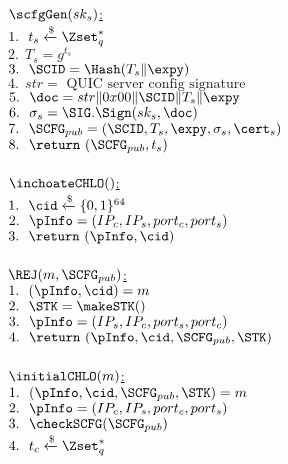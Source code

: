 

\noindent
\underline{$\scfgGen(sk_s)$:} \\
 $1.\ \ t_s \xleftarrow{\$} \Zset_{q}^{\ast}$ \\
 $2.\ \ T_s = g^{t_s}$ \\
 $3.\ \ \SCID = \Hash(T_s \| \expy)$ \\
 $4.\ \ str = \text{ QUIC server config signature }$ \\
 $5.\ \ \doc = str \| 0x00 \| \SCID \| T_s \| \expy$ \\
 $6.\ \ \sigma_s = \SIG.\Sign(sk_s, \doc)$ \\
 $7.\ \ \SCFG_{pub} = (\SCID, T_s, \expy, \sigma_s, \cert_s)$ \\
 $8.\ \ \return\ (\SCFG_{pub}, t_s)$ \\
\\
\underline{$\inchoateCHLO()$:} \\
 $1.\ \ \cid \xleftarrow{\$} \{0,1\}^{64} $ \\
 $2.\ \ \pInfo = (IP_c, IP_s, port_c, port_s)$ \\
 $3.\ \ \return\ (\pInfo, \cid)$ \\
\\
\underline{$\REJ(m, \SCFG_{pub})$:} \\
 $1.\ \ (\pInfo, \cid) = m$ \\
 $2.\ \ \STK = \makeSTK()$ \\
 $3.\ \ \pInfo = (IP_s, IP_c, port_s, port_c)$ \\
 $4.\ \ \return\ (\pInfo, \cid, \SCFG_{pub}, \STK)$ \\
\\
\underline{$\initialCHLO(m)$:} \\
 $1.\ \ (\pInfo, \cid, \SCFG_{pub}, \STK) = m$ \\
 $2.\ \ \pInfo = (IP_c, IP_s, port_c, port_s)$ \\
 $3.\ \ \checkSCFG(\SCFG_{pub})$ \\
 $4.\ \ t_c \xleftarrow{\$} \Zset_{q}^{\ast}$ \\
